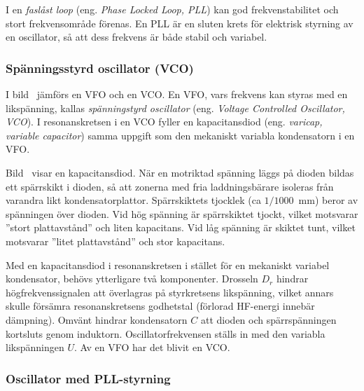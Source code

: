 I en \emph{faslåst loop} (eng. \emph{Phase Locked Loop, PLL}) kan god
frekvenstabilitet och stort frekvensområde förenas.
En PLL är en sluten krets för elektrisk styrning av en oscillator, så att dess
frekvens är både stabil och variabel.

\subsubsection{Spänningsstyrd oscillator (VCO)}

I bild~ jämförs en VFO och en VCO.
En VFO, vars frekvens kan styras med en likspänning, kallas \emph{spänningstyrd
oscillator} (eng. \emph{Voltage Controlled Oscillator, VCO}).
I resonanskretsen i en VCO fyller en kapacitansdiod (eng. \emph{varicap, variable
capacitor}) samma uppgift som den mekaniskt variabla kondensatorn i en VFO.


Bild~ visar en kapacitansdiod.
När en motriktad spänning läggs på dioden bildas ett spärrskikt i dioden,
så att zonerna med fria laddningsbärare isoleras från varandra likt
kondensatorplattor.
Spärrskiktets tjocklek (ca $1/1000$~\unit{\milli\metre}) beror av spänningen
över dioden.
Vid hög spänning är spärrskiktet tjockt, vilket motsvarar
''stort plattavstånd'' och liten kapacitans.
Vid låg spänning är skiktet tunt, vilket motsvarar ''litet plattavstånd'' och
stor kapacitans.

Med en kapacitansdiod i resonanskretsen i stället för en mekaniskt
variabel kondensator, behövs ytterligare två komponenter.
Drosseln \(D_r\) hindrar högfrekvenssignalen att överlagras på styrkretsens
likspänning, vilket annars skulle försämra resonanskretsens godhetstal
(förlorad HF-energi innebär dämpning).
Omvänt hindrar kondensatorn \(C\) att dioden och spärrspänningen kortsluts
genom induktorn.
Oscillatorfrekvensen ställs in med den variabla likspänningen \(U\).
Av en VFO har det blivit en VCO.

\subsubsection{Oscillator med PLL-styrning}

